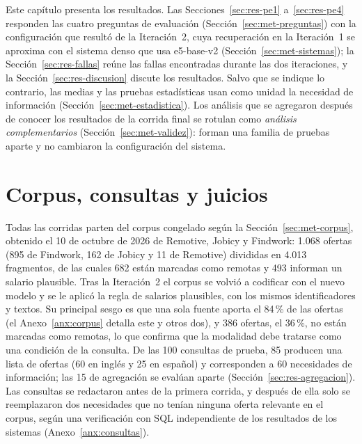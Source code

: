 
Este capítulo presenta los resultados. Las Secciones~\ref{sec:res-pe1} a~\ref{sec:res-pe4} responden las cuatro preguntas de evaluación (Sección~\ref{sec:met-preguntas}) con la configuración que resultó de la Iteración~2, cuya recuperación en la Iteración~1 se aproxima con el sistema denso que usa e5-base-v2 (Sección~\ref{sec:met-sistemas}); la Sección~\ref{sec:res-fallas} reúne las fallas encontradas durante las dos iteraciones, y la Sección~\ref{sec:res-discusion} discute los resultados. Salvo que se indique lo contrario, las medias y las pruebas estadísticas usan como unidad la necesidad de información (Sección~\ref{sec:met-estadistica}). Los análisis que se agregaron después de conocer los resultados de la corrida final se rotulan como \emph{análisis complementarios} (Sección~\ref{sec:met-validez}): forman una familia de pruebas aparte y no cambiaron la configuración del sistema.

\section{Corpus, consultas y juicios}
\label{sec:res-corpus}

Todas las corridas parten del corpus congelado según la Sección~\ref{sec:met-corpus}, obtenido el 10 de octubre de 2026 de Remotive, Jobicy y Findwork: 1.068 ofertas (895 de Findwork, 162 de Jobicy y 11 de Remotive) divididas en 4.013 fragmentos, de las cuales 682 están marcadas como remotas y 493 informan un salario plausible. Tras la Iteración~2 el corpus se volvió a codificar con el nuevo modelo y se le aplicó la regla de salarios plausibles, con los mismos identificadores y textos. Su principal sesgo es que una sola fuente aporta el 84\,\% de las ofertas (el Anexo~\ref{anx:corpus} detalla este y otros dos), y 386 ofertas, el 36\,\%, no están marcadas como remotas, lo que confirma que la modalidad debe tratarse como una condición de la consulta. De las 100 consultas de prueba, 85 producen una lista de ofertas (60 en inglés y 25 en español) y corresponden a 60 necesidades de información; las 15 de agregación se evalúan aparte (Sección~\ref{sec:res-agregacion}). Las consultas se redactaron antes de la primera corrida, y después de ella solo se reemplazaron dos necesidades que no tenían ninguna oferta relevante en el corpus, según una verificación con SQL independiente de los resultados de los sistemas (Anexo~\ref{anx:consultas}).

